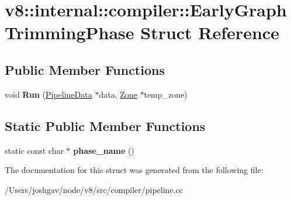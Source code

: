 \hypertarget{structv8_1_1internal_1_1compiler_1_1_early_graph_trimming_phase}{}\section{v8\+:\+:internal\+:\+:compiler\+:\+:Early\+Graph\+Trimming\+Phase Struct Reference}
\label{structv8_1_1internal_1_1compiler_1_1_early_graph_trimming_phase}
\subsection*{Public Member Functions}
\begin{DoxyCompactItemize}
\item 
void {\bfseries Run} (\hyperlink{classv8_1_1internal_1_1compiler_1_1_pipeline_data}{Pipeline\+Data} $\ast$data, \hyperlink{classv8_1_1internal_1_1_zone}{Zone} $\ast$temp\+\_\+zone)\hypertarget{structv8_1_1internal_1_1compiler_1_1_early_graph_trimming_phase_a213052e80ffa36910a84687971d00c49}{}\label{structv8_1_1internal_1_1compiler_1_1_early_graph_trimming_phase_a213052e80ffa36910a84687971d00c49}

\end{DoxyCompactItemize}
\subsection*{Static Public Member Functions}
\begin{DoxyCompactItemize}
\item 
static const char $\ast$ {\bfseries phase\+\_\+name} ()\hypertarget{structv8_1_1internal_1_1compiler_1_1_early_graph_trimming_phase_aad70cad301bf0de3143a7bfe6fdbf259}{}\label{structv8_1_1internal_1_1compiler_1_1_early_graph_trimming_phase_aad70cad301bf0de3143a7bfe6fdbf259}

\end{DoxyCompactItemize}


The documentation for this struct was generated from the following file\+:\begin{DoxyCompactItemize}
\item 
/\+Users/joshgav/node/v8/src/compiler/pipeline.\+cc\end{DoxyCompactItemize}
